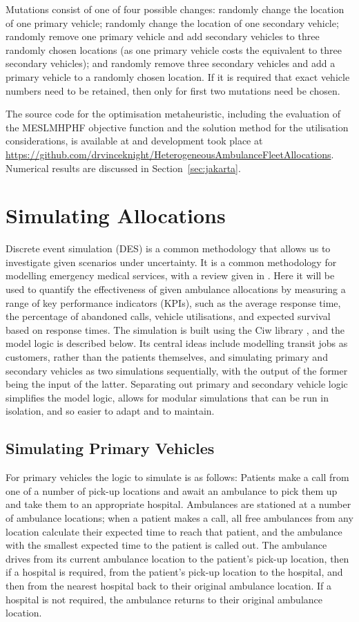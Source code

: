 \documentclass[numbers,webpdf,imaman]{ima-authoring-template}%
\begin{document}
Mutations consist of one of four possible changes: randomly change the location
of one primary vehicle; randomly change the location of one secondary vehicle;
randomly remove one primary vehicle and add secondary vehicles to three randomly
chosen locations (as one primary vehicle costs the equivalent to three secondary
vehicles); and randomly remove three secondary vehicles and add a primary
vehicle to a randomly chosen location. If it is required that exact vehicle
numbers need to be retained, then only for first two mutations need be chosen.

The source code for the optimisation metaheuristic, including the evaluation of
the MESLMHPHF objective function and the solution method for the utilisation
considerations, is available at \citet{zenodo_opt} and development took place at
\url{https://github.com/drvinceknight/HeterogeneousAmbulanceFleetAllocations}.
Numerical results are discussed in Section~\ref{sec:jakarta}.


\section{Simulating Allocations}\label{sec:simulation}
Discrete event simulation (DES) is a common methodology that allows us to
investigate given scenarios under uncertainty. It is a common methodology for
modelling emergency medical services, with a review given in
\citet{aboueljinane13}. Here it will be used to quantify the effectiveness of
given ambulance allocations by measuring a range of key performance indicators
(KPIs), such as the average response time, the percentage of abandoned calls,
vehicle utilisations, and expected survival based on response times. The
simulation is built using the Ciw library \citep{palmer2019ciw}, and the model
logic is described below. Its central ideas include modelling transit jobs as
customers, rather than the patients themselves, and simulating primary and
secondary vehicles as two simulations sequentially, with the output of the
former being the input of the latter. Separating out primary and secondary
vehicle logic simplifies the model logic, allows for modular simulations that
can be run in isolation, and so easier to adapt and to maintain.


\subsection{Simulating Primary Vehicles}\label{sec:simulation_primary}
For primary vehicles the logic to simulate is as follows: Patients make a call
from one of a number of pick-up locations and await an ambulance to pick them
up and take them to an appropriate hospital. Ambulances are stationed at a
number of ambulance locations; when a patient makes a call, all free
ambulances from any location calculate their expected time to reach that
patient, and the ambulance with the smallest expected time to the patient is
called out. The ambulance drives from its current ambulance location to the
patient's pick-up location, then if a hospital is required, from the patient's
pick-up location to the hospital, and then from the nearest hospital back to
their original ambulance location. If a hospital is not required, the
ambulance returns to their original ambulance location.
\end{document}

